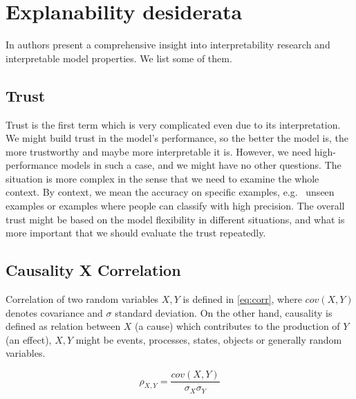 

\section{Explanability desiderata}
In \cite{Lipton2016} authors present a comprehensive insight into interpretability research and interpretable model properties. We list some of them.

\subsection{Trust}
Trust is the first term which is very complicated even due to its interpretation. We might build trust in the model's performance, so the better the model is, the more trustworthy and maybe more interpretable it is. However, we need high-performance models in such a case, and we might have no other questions. The situation is more complex in the sense that we need to examine the whole context. By context, we mean the accuracy on specific examples, e.g. \ unseen examples or examples where people can classify with high precision. The overall trust might be based on the model flexibility in different situations, and what is more important that we should evaluate the trust repeatedly.

\subsection{Causality X Correlation}
Correlation of two random variables $X,Y$ is defined in \ref{eq:corr}, where $cov(X,Y)$ denotes covariance and $\sigma$ standard deviation. On the other hand, causality is defined as relation between $X$ (a cause) which contributes to the production of $Y$ (an effect), $X,Y$ might be events, processes, states, objects or generally random variables.

\begin{equation} \label{eq:corr}
    \rho_{X,Y}=\frac{cov(X,Y)}{\sigma_X\sigma_Y}
\end{equation}

